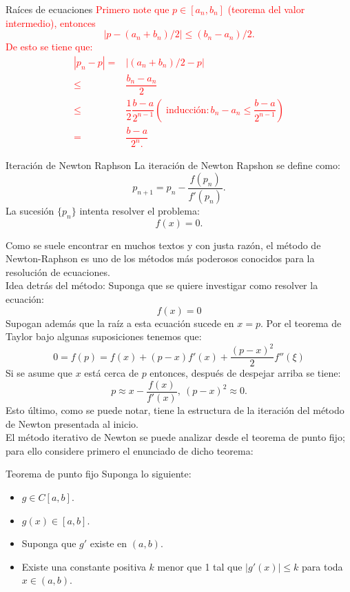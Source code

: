 \begin{frame}{Raíces de ecuaciones}
\textcolor{red}{
\indent Primero note que $p\in [a_n,b_n]$ (teorema del valor intermedio), entonces $$|p-(a_n+b_n)/2|\leq(b_n-a_n)/2.$$ De esto se tiene que:
\begin{align*}
|p_n-p|=&|(a_n+b_n)/2-p|\\
\leq & \dfrac{b_n-a_n}{2}\\
\leq & \dfrac{1}{2}\dfrac{b-a}{2^{n-1}} (\text{ inducción}: b_n-a_n\leq \dfrac{b-a}{2^{n-1}})\\
=& \dfrac{b-a}{2^n.}
\end{align*}
}
\label{RetornoTeoremaRaices4}
\begin{block}{Iteración de Newton Raphson}
La iteración de Newton Rapshon se define como:
$$p_{n+1}=p_n-\dfrac{f(p_n)}{f'(p_n)}.$$
La sucesión $\{p_n\}$ intenta resolver el problema:
$$f(x)=0.$$
\end{block}
\indent Como se suele encontrar en muchos textos y con justa razón, el método de Newton-Raphson  es uno de los métodos más poderosos conocidos para la resolución de ecuaciones. \\
\indent Idea detrás del método: Suponga que se quiere investigar como resolver la ecuación:
$$f(x)=0$$
\indent Supogan además que la raíz a esta ecuación sucede en $x=p.$ Por el teorema de Taylor bajo algunas suposiciones tenemos que:
$$0=f(p)=f(x)+(p-x)f'(x)+\dfrac{(p-x)^2}{2}f''(\xi)$$
\indent Si se asume que $x$ está cerca de $p$ entonces, después de despejar arriba se tiene:
$$p\approx x-\dfrac{f(x)}{f'(x)},\ (p-x)^2\approx 0.$$
\indent Esto último, como se puede notar, tiene la estructura de la iteración del método de Newton presentada al inicio.\\
\indent El método iterativo de Newton se puede analizar desde el teorema de punto fijo; para ello considere primero el enunciado de dicho teorema:
\framebreak
\begin{block}{Teorema de punto fijo}
Suponga lo siguiente:
\begin{itemize}
\item $g\in C[a,b].$
\item $g(x)\in[a,b].$
\item Suponga que $g'$ existe en $(a,b)$.
\item Existe una constante positiva $k$ menor que 1 tal que $|g'(x)|\leq k$
para toda $x\in (a,b).$
\end{itemize}

\end{block}
\end{frame}
